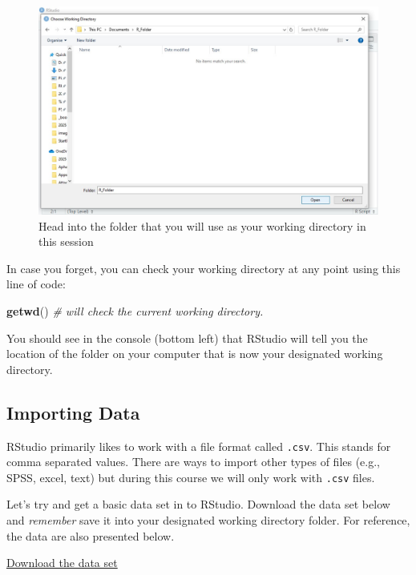 \documentclass[
]{book}
\newenvironment{Shaded}{\begin{snugshade}}{\end{snugshade}}
\newcommand{\CommentTok}[1]{\textcolor[rgb]{0.56,0.35,0.01}{\textit{#1}}}
\newcommand{\FunctionTok}[1]{\textcolor[rgb]{0.13,0.29,0.53}{\textbf{#1}}}
\newcommand{\NormalTok}[1]{#1}
\let\oldsubsection\subsection
\renewcommand{\subsection}{\needspace{3\baselineskip}\oldsubsection}  %
\begin{document}
\begin{figure}[H]

{\centering \includegraphics[width=0.75\linewidth]{images/setwd2} 

}

\caption{Head into the folder that you will use as your working directory in this session}\label{fig:fig-environment-5}
\end{figure}

In case you forget, you can check your working directory at any point using this line of code:

\begin{Shaded}
\begin{Highlighting}[]
\FunctionTok{getwd}\NormalTok{() }\CommentTok{\# will check the current working directory.}
\end{Highlighting}
\end{Shaded}

You should see in the console (bottom left) that RStudio will tell you the location of the folder on your computer that is now your designated working directory.

\subsection{Importing Data}\label{importing-data-1}

RStudio primarily likes to work with a file format called \texttt{.csv}. This stands for comma separated values. There are ways to import other types of files (e.g., SPSS, excel, text) but during this course we will only work with \texttt{.csv} files.

Let's try and get a basic data set in to RStudio. Download the data set below and \emph{remember} save it into your designated working directory folder. For reference, the data are also presented below.

\href{data/height.csv}{Download the data set}
\end{document}
